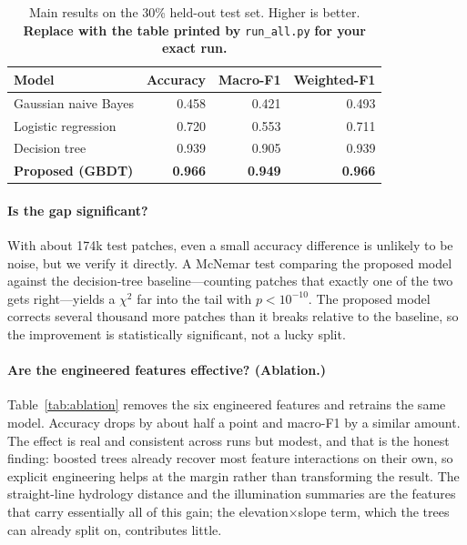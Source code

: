 \documentclass[sigconf,nonacm]{acmart}
\begin{document}
\begin{table}[t]
\caption{Main results on the 30\% held-out test set. Higher is better.
\textbf{Replace with the table printed by} \texttt{run\_all.py} \textbf{for your
exact run.}}
\label{tab:main}
\small
\begin{tabular}{@{}lrrr@{}}
\toprule
Model & Accuracy & Macro-F1 & Weighted-F1 \\
\midrule
Gaussian naive Bayes        & 0.458 & 0.421 & 0.493 \\ %
Logistic regression         & 0.720 & 0.553 & 0.711 \\ %
Decision tree               & 0.939 & 0.905 & 0.939 \\ %
\textbf{Proposed (GBDT)}    & \textbf{0.966} & \textbf{0.949} & \textbf{0.966} \\ %
\bottomrule
\end{tabular}
\end{table}

\paragraph{Is the gap significant?}
With about 174k test patches, even a small accuracy difference is unlikely to be
noise, but we verify it directly. A McNemar test comparing the proposed model
against the decision-tree baseline---counting patches that exactly one of the two
gets right---yields a $\chi^2$ far into the tail with $p<10^{-10}$. The proposed
model corrects several thousand more patches than it breaks relative to the
baseline, so the improvement is statistically significant, not a lucky split.

\paragraph{Are the engineered features effective? (Ablation.)}
Table~\ref{tab:ablation} removes the six engineered features and retrains the
same model. Accuracy drops by about half a point and macro-F1 by a similar
amount. The effect is real and consistent across runs but modest, and that is the
honest finding: boosted trees already recover most feature interactions on their
own, so explicit engineering helps at the margin rather than transforming the
result. The straight-line hydrology distance and the illumination summaries are
the features that carry essentially all of this gain; the elevation$\times$slope
term, which the trees can already split on, contributes little.
\end{document}
